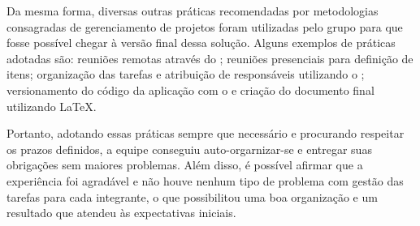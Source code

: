 Da mesma forma, diversas outras práticas recomendadas por metodologias consagradas de gerenciamento de projetos foram utilizadas pelo grupo para que fosse possível chegar à versão final dessa solução. Alguns exemplos de práticas adotadas são: reuniões remotas através do \software{} \hangouts{}; reuniões presenciais para definição de itens; organização das tarefas e atribuição de responsáveis utilizando o \software{} \trello{}; versionamento do código da aplicação com o \git{} e criação do documento final utilizando \LaTeX{}.

Portanto, adotando essas práticas sempre que necessário e procurando respeitar os prazos definidos, a equipe conseguiu auto-orgarnizar-se e entregar suas obrigações sem maiores problemas. Além disso, é possível afirmar que a experiência foi agradável e não houve nenhum tipo de problema com gestão das tarefas para cada integrante, o que possibilitou uma boa organização e um resultado que atendeu às expectativas iniciais.